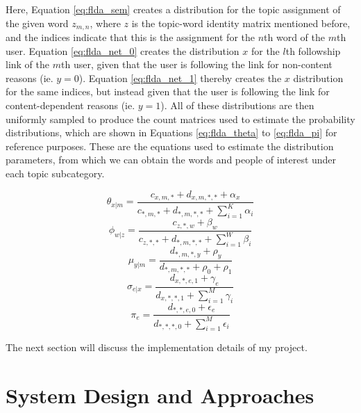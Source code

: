 \documentclass[a4paper]{article}
\begin{document}
Here, Equation \ref{eq:flda_sem} creates a distribution for the topic assignment of the given word $z_{m, n}$, where $z$ is the topic-word identity matrix mentioned before, and the indices indicate that this is the assignment for the $n$th word of the $m$th user. Equation \ref{eq:flda_net_0} creates the distribution $x$ for the $l$th followship link of the $m$th user, given that the user is following the link for non-content reasons (ie. $y = 0$). Equation \ref{eq:flda_net_1} thereby creates the $x$ distribution for the same indices, but instead given that the user is following the link for content-dependent reasons (ie. $y = 1$). All of these distributions are then uniformly sampled to produce the count matrices used to estimate the probability distributions, which are shown in Equations \ref{eq:flda_theta} to \ref{eq:flda_pi} for reference purposes. These are the equations used to estimate the distribution parameters, from which we can obtain the words and people of interest under each topic subcategory.

\begin{equation}\label{eq:flda_theta}
  \theta_{x | m} = \frac{c_{x, m, *} + d_{x, m, *, *} + \alpha_x}{c_{*, m, *} + d_{*, m, *, *} + \sum_{i = 1}^K\alpha_i}
\end{equation}
\begin{equation}\label{eq:flda_phi}
  \phi_{w | z} = \frac{c_{z, *, w} + \beta_w}{c_{z, *, *} + d_{*, m, *, *} + \sum_{i = 1}^W\beta_i}
\end{equation}
\begin{equation}\label{eq:flda_mu}
  \mu_{y | m} = \frac{d_{*, m, *, y} + \rho_y}{d_{*, m, *, *} + \rho_0 + \rho_1}
\end{equation}
\begin{equation}\label{eq:flda_sigma}
  \sigma_{e | x} = \frac{d_{x, *, e, 1} + \gamma_e}{d_{x, *, *, 1} + \sum_{i = 1}^M\gamma_i}
\end{equation}
\begin{equation}\label{eq:flda_pi}
  \pi_{e} = \frac{d_{*, *, e, 0} + \epsilon_e}{d_{*, *, *, 0} + \sum_{i = 1}^M\epsilon_i}
\end{equation}

The next section will discuss the implementation details of my project.

\section{System Design and Approaches}
\label{sec:approach}
\end{document}
